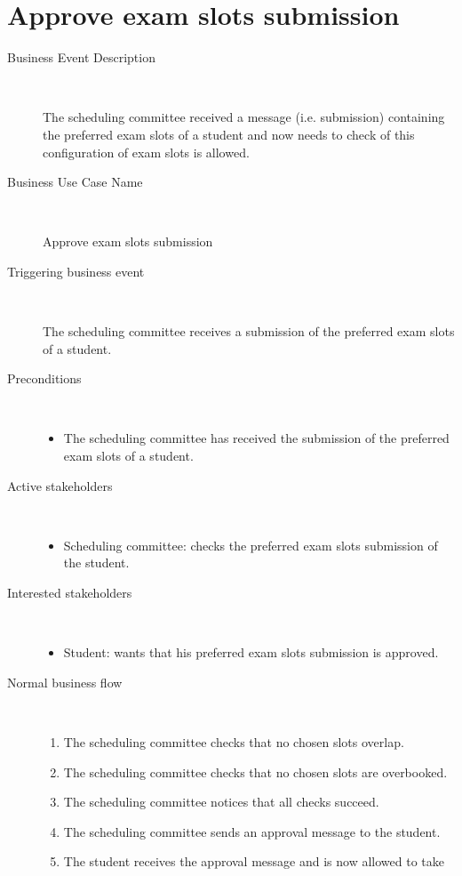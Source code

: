 \section{Approve exam slots submission}

\begin{description}
	\item[Business Event Description] \ 
		\par The scheduling committee received a message (i.e. submission) containing
		the preferred exam slots of a student and now needs to check of this
		configuration of exam slots is allowed.
	\item[Business Use Case Name] \ 
		\par Approve exam slots submission
	\item[Triggering business event] \ 
		\par The scheduling committee receives a submission of the preferred exam
		slots of a student.
	\item[Preconditions] \
	\begin{itemize}
		\item The scheduling committee has received the submission of the preferred
		exam slots of a student.
	\end{itemize}
	\item[Active stakeholders] \ 
	\begin{itemize}
		\item Scheduling committee: checks the preferred exam slots submission of the
		student.
	\end{itemize}
	\item[Interested stakeholders] \ 
		\begin{itemize}
		\item Student: wants that his preferred exam slots submission is approved.
		\end{itemize}
	\item[Normal business flow] \ 
	\begin{enumerate}
	  	\item The scheduling committee checks that no chosen slots overlap.
	  	\item The scheduling committee checks that no chosen slots are overbooked.
	  	\item The scheduling committee notices that all checks succeed.
	  	\item The scheduling committee sends an approval message to the student.
	  	\item The student receives the approval message and is now allowed to take

\end{enumerate}
\end{description}
